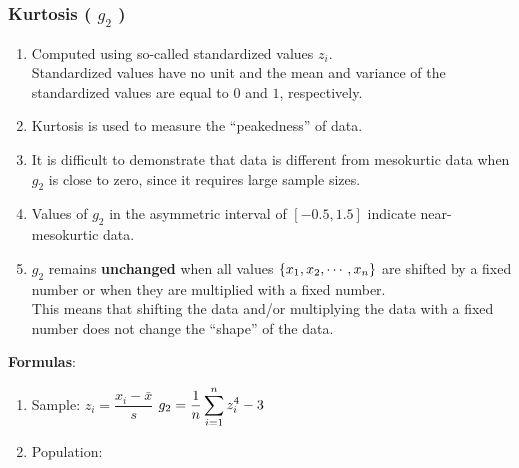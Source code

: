 \subsubsection{Kurtosis ( $g_2$ ) \cite{statistics/book/Statistics-for-Data-Scientists/Maurits-Kaptein}} \label{Data/Describing Data/Central Tendency/Kurtosis}

\begin{enumerate}
    \item Computed using so-called standardized values $z_i$. \hfill \cite{statistics/book/Statistics-for-Data-Scientists/Maurits-Kaptein}\\
    Standardized values have no unit and the mean and variance of the standardized values are equal to $0$ and $1$, respectively. \hfill \cite{statistics/book/Statistics-for-Data-Scientists/Maurits-Kaptein}

    \item Kurtosis is used to measure the “peakedness” of data. \hfill \cite{statistics/book/Statistics-for-Data-Scientists/Maurits-Kaptein}

    \item It is difficult to demonstrate that data is different from mesokurtic data when $g_2$ is close to zero, since it requires large sample sizes. \hfill \cite{statistics/book/Statistics-for-Data-Scientists/Maurits-Kaptein}

    \item Values of $g_2$ in the asymmetric interval of $[-0.5, 1.5]$ indicate near-mesokurtic data. \hfill \cite{statistics/book/Statistics-for-Data-Scientists/Maurits-Kaptein}

    \item $g_2$ remains \textbf{unchanged} when all values $\left\{x_1, x_2, \cdots, x_n\right\}$ are shifted by a fixed number or when they are multiplied with a fixed number. \hfill \cite{statistics/book/Statistics-for-Data-Scientists/Maurits-Kaptein} \\
    This means that shifting the data and/or multiplying the data with a fixed number does not change the “shape” of the data. \hfill \cite{statistics/book/Statistics-for-Data-Scientists/Maurits-Kaptein}
\end{enumerate}


\vspace{0.3cm}
\textbf{Formulas}:
\begin{enumerate}
    \item Sample:
    \label{Data/Describing Data/Central Tendency/Kurtosis/Sample}
    \label{Data/Describing Data/Central Tendency/Kurtosis/z-value}
    \hspace{1cm}
    $z_i = \dfrac{x_i - \bar{x}}{s}$
    \hspace{1cm}
    $g_2 = \dfrac{1}{n} \displaystyle\sum_{i=1}^{n} z_i^4 - 3$


    \item Population:
\end{enumerate}


